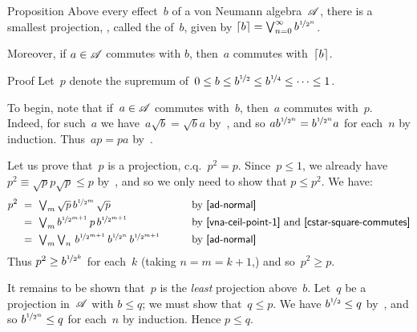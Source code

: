\documentclass[main]{subfiles}
\begin{document}
%
%
\begin{parsec}%
\begin{point}{Proposition}%
Above every effect~$b$ of a von Neumann algebra~$\mathscr{A}$,
there is a smallest projection, ,
called the  of~$b$,
 given by $\left\lceil b\right\rceil=\bigvee_{n=0}^\infty b^{\nicefrac{1}{2^n}}$.
\begin{point}%
Moreover, if $a\in \mathscr{A}$ commutes with $b$,
then~$a$ commutes with~$\left\lceil b\right\rceil$.
\end{point}
\end{point}
\begin{point}{Proof}
Let~$p$ denote the supremum of~$0\leq b\leq b^{\nicefrac{1}{2}}\leq
b^{\nicefrac{1}{4}}\leq\dotsb\leq 1$.
\begin{point}%
To begin,
note that if~$a\in \mathscr{A}$
commutes with~$b$,
then~$a$ commutes with~$p$.
Indeed, for such~$a$ we have~$a\sqrt{b}=\sqrt{b}a$
by~,
and so $a b^{\nicefrac{1}{2^n}} = b^{\nicefrac{1}{2^n}} a$
for each~$n$
by induction.
Thus~$ap=pa$ by~.
\end{point}
\begin{point}%
Let us prove that~$p$ is a projection, c.q.~$p^2=p$. 
Since~$p\leq 1$, we already have $p^2\equiv \sqrt{p}p\sqrt{p}\leq p$
by~,
and so we only need to show that $p\leq p^2$. We have:
\begin{alignat*}{3}
 p^2 \ &=\  \textstyle \bigvee_m \sqrt{p} \,b^{\nicefrac{1}{2^m}} \,\sqrt{p}
\qquad&&\text{by \sref{ad-normal}} \\
&=\ \textstyle\bigvee_m b^{\nicefrac{1}{2^{m+1}}}\, p\,
b^{\nicefrac{1}{2^{m+1}}} 
\qquad&&\text{by \sref{vna-ceil-point-1} and \sref{cstar-square-commutes}} \\
&=\ \textstyle \bigvee_m \bigvee_n \, 
b^{\nicefrac{1}{2^{m+1}}}\, b^{\nicefrac{1}{2^n}}\,
b^{\nicefrac{1}{2^{m+1}}} \qquad && \text{by \sref{ad-normal}}
\end{alignat*}
Thus $p^2 \geq b^{\nicefrac{1}{2^k}}$
for each~$k$ (taking $n=m=k+1$,)
and so~$p^2 \geq p$.
\end{point}
\begin{point}%
It remains to be shown that~$p$ is the \emph{least} projection
above~$b$.
Let~$q$ be a projection in~$\mathscr{A}$ with $b\leq q$;
we must show that~$q\leq p$.
We have $b^{\nicefrac{1}{2}}\leq q$
by~,
and so $b^{\nicefrac{1}{2^n}}\leq q$ for each~$n$ by induction.
Hence $p\leq q$.
\end{point}
\end{point}
\end{parsec}
\end{document}
